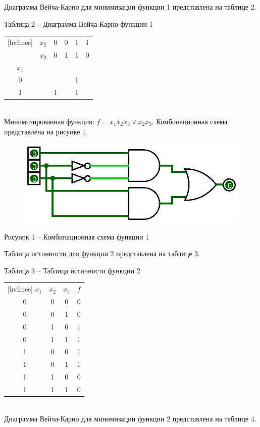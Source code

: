 \documentclass[a4paper,14pt]{extarticle}
\begin{document}
  Диаграмма Вейча-Карно для минимизации функции 1 представлена на таблице 2.
  
  \noindent Таблица 2 -- Диаграмма Вейча-Карно функции 1 \\
  \begin{NiceTabular}{cccccc}[hvlines]
    & $x_2$ & 0 & 0 & 1 & 1 \\
    & $x_3$ & 0 & 1 & 1 & 0 \\
    $x_1$ & & & & & \\
    0 & & & & 1 & \\
    1 & & 1 & & 1 &
  \end{NiceTabular} \\
  
  Минимизированная функция: $f=x_1\overline{x}_2\overline{x}_3\lor x_2x_3$. Комбинационная схема представлена на рисунке 1.
  
  \begin{figure}[h]
    \centering
    \includegraphics[width=0.5\linewidth]{images/s-1-1}
  \end{figure}
  \begin{center}
    Рисунок 1 – Комбинационная схема функции 1
  \end{center}
  
  \pagebreak
  Таблица истинности для функции 2 представлена на таблице 3.
  
  \noindent Таблица 3 -- Таблица истинности функции 2 \\
  \begin{NiceTabular}{cccc}[hvlines]
    $x_1$ & $x_2$ & $x_3$ & $f$ \\
    0 & 0 & 0 & 0 \\
    0 & 0 & 1 & 0 \\
    0 & 1 & 0 & 1 \\
    0 & 1 & 1 & 1 \\
    1 & 0 & 0 & 1 \\
    1 & 0 & 1 & 1 \\
    1 & 1 & 0 & 0 \\
    1 & 1 & 1 & 0
  \end{NiceTabular}\\
  
  Диаграмма Вейча-Карно для минимизации функции 2 представлена на таблице 4.
  
\end{document}
